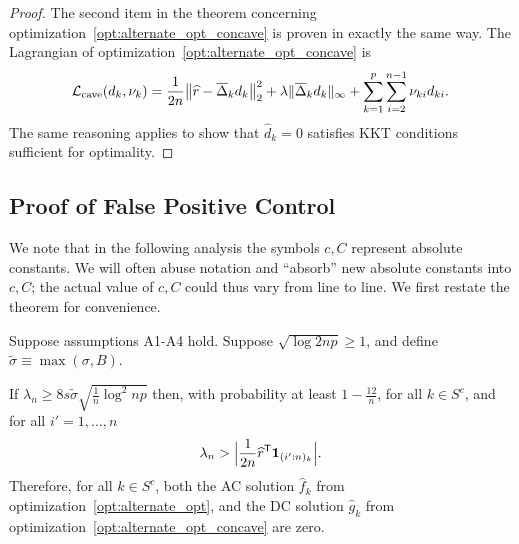 \begin{proof}
The second item in the theorem concerning optimization~\ref{opt:alternate_opt_concave} is proven in exactly the same way. 
The Lagrangian of optimization~\ref{opt:alternate_opt_concave} is
\[
\mathcal{L}_{\textrm{cave}}(d_k, \nu_k) = 
  \frac{1}{2n} \big\| \widehat{r} - \overline{\Delta}_k d_k \big \|_2^2 + 
  \lambda \| \overline{\Delta}_k d_k \|_\infty + \sum_{k=1}^p \sum_{i=2}^{n-1} \nu_{ki} d_{ki}.
\]
The same reasoning applies to show that $\hat{d}_k = 0$ satisfies KKT conditions sufficient for optimality.
\end{proof}
 
 
 
 \subsection{Proof of False Positive Control}
 \label{sec:false_positive_proof}
 
 We note that in the following analysis the symbols $c,C$ represent
 absolute constants. We will often abuse notation and ``absorb'' new
 absolute constants into $c, C$; the actual value of $c, C$ could thus
 vary from line to line.
We first restate the theorem for convenience. 

\begin{theorem} 
Suppose assumptions A1-A4 hold. Suppose $\sqrt{\log 2np} \geq 1$, and define $\tilde{\sigma} \equiv \max(\sigma, B)$.

If $\lambda_n \geq 8 s \tilde{\sigma}  \sqrt{ \frac{1}{n} \log^2 np}$ then, with probability at least $ 1 - \frac{12}{n}$, for all $k \in S^c$, and for all $i'=1,...,n$
\[
\lambda_n > \Big| \frac{1}{2n}\widehat{r}^{\mathsf{T}} \mbox{\boldmath $1$}_{(i':n)_k} \Big|.
\]
Therefore, for all $k \in S^c$, both the AC solution $\hat{f}_k$ from optimization~\ref{opt:alternate_opt}, and the DC solution $\hat{g}_k$ from optimization~\ref{opt:alternate_opt_concave} are zero. 
\end{theorem}

